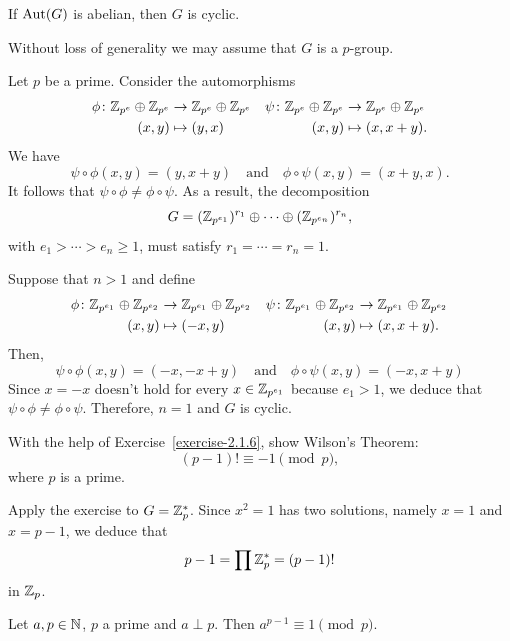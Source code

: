 \begin{exr}
    If\/ ${\rm Aut}(G)$ is abelian, then\/ $G$ is cyclic.
\end{exr}

\begin{solution} Without loss of generality we may assume that $G$ is a $p$-group.

Let $p$ be a prime. Consider the automorphisms
\begin{align*}
    \phi\colon\mathbb{Z}_{p^e}\oplus\mathbb{Z}_{p^e}
        &\to\mathbb{Z}_{p^e}\oplus\mathbb{Z}_{p^e}
    &\psi\colon\mathbb{Z}_{p^e}\oplus\mathbb{Z}_{p^e}
        &\to\mathbb{Z}_{p^e}\oplus\mathbb{Z}_{p^e}\\
    (x,y)&\mapsto(y,x)&(x,y)&\mapsto(x,x+y).
\end{align*}
We have
$$
    \psi\circ\phi(x,y)=(y,x+y)\quad\text{and}\quad
    \phi\circ\psi(x,y)=(x+y,x).
$$
It follows that $\psi\circ\phi\ne\phi\circ\psi$. As a result, the decomposition
$$
    G=(\mathbb{Z}_{p^{e_1}})^{r_1}\oplus\cdots\oplus(\mathbb{Z}_{p^{e_n}})^{r_n},
$$
with $e_1>\cdots>e_n\ge1$, must satisfy $r_1=\cdots=r_n=1$.

Suppose that $n>1$ and define
\begin{align*}
    \phi\colon\mathbb{Z}_{p^{e_1}}\oplus\mathbb{Z}_{p^{e_2}}
        &\to\mathbb{Z}_{p^{e_1}}\oplus\mathbb{Z}_{p^{e_2}}
    &\psi\colon\mathbb{Z}_{p^{e_1}}\oplus\mathbb{Z}_{p^{e_2}}
        &\to\mathbb{Z}_{p^{e_1}}\oplus\mathbb{Z}_{p^{e_2}}\\
        (x,y)&\mapsto(-x,y)&(x,y)&\mapsto(x,x+y).
\end{align*}
Then,
$$
    \psi\circ\phi(x,y)=(-x,-x+y)\quad\text{and}\quad
    \phi\circ\psi(x,y)=(-x,x+y)
$$
Since $x=-x$ doesn't hold for every $x\in\mathbb{Z}_{p^{e_1}}$ because $e_1>1$, we deduce that $\psi\circ\phi\ne\phi\circ\psi$. Therefore, $n=1$ and $G$ is cyclic.  \end{solution}

\begin{exr}
    With the help of\/ \textrm{\upshape Exercise~\ref{exercise-2.1.6}}, show Wilson's Theorem:
    $$
        (p - 1)! \equiv -1 \pmod p,
    $$
    where\/ $p$ is a prime.
\end{exr}

\begin{solution} Apply the exercise to $G=\mathbb{Z}_p^*$. Since $x^2=1$ has two solutions, namely $x=1$ and $x=p-1$, we deduce that
$$
    p-1=\prod\mathbb{Z}_p^*=(p-1)!
$$
in $\mathbb{Z}_p$.  \end{solution}

\begin{exr}
    Let\/ $a, p \in \mathbb{N}$, $p$ a prime and\/ $a\perp p$. Then\/ $a^{p-1} \equiv 1 \pmod{p}$.
\end{exr}

